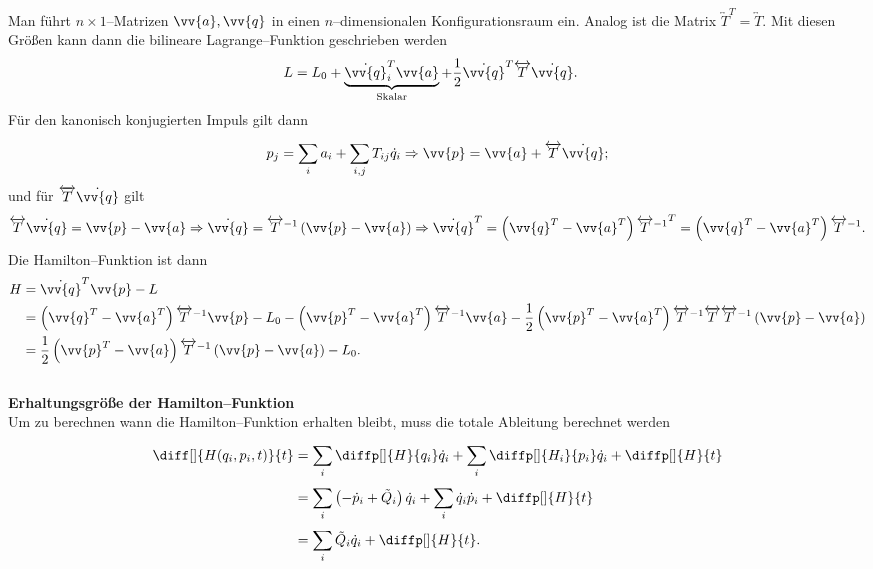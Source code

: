 \documentclass[a4paper,12pt]{article}
\numberwithin{equation}{section}
\begin{document}
Man führt $n\times 1$--Matrizen $\vv{a},\vv{q}$ in einen $n$--dimensionalen Konfigurationsraum ein. Analog ist die Matrix $\overleftrightarrow{T}^T=\overleftrightarrow{T}$. Mit diesen Größen kann dann die bilineare Lagrange--Funktion geschrieben werden
\begin{align*}
        L&=L_0+\underbrace{\dot{\vv{q}}_i^T\vv{a}}_{\text{Skalar}}+\dfrac{1}{2}\dot{\vv{q}}^T\overleftrightarrow{T}\dot{\vv{q}}
.\end{align*}
Für den kanonisch konjugierten Impuls gilt dann
\begin{align*}
        p_j=\sum_{i}^{}a_i+\sum_{i,j}^{}T_{ij}\dot{q}_i\Rightarrow \vv{p}=\vv{a}+\overleftrightarrow{T}\dot{\vv{q}}
;\end{align*}
und für $\overleftrightarrow{T}\dot{\vv{q}}$ gilt
\begin{align*}
        \overleftrightarrow{T}\dot{\vv{q}}=\vv{p}-\vv{a}\Rightarrow \dot{\vv{q}}=\overleftrightarrow{T}^{-1}\left(\vv{p}-\vv{a}\right)\Rightarrow \dot{\vv{q}}^T=\left(\vv{q}^T-\vv{a}^T\right){\overleftrightarrow{T}^{-1}}^T=\left(\vv{q}^T-\vv{a}^T\right)\overleftrightarrow{T}^{-1}
.\end{align*}
Die Hamilton--Funktion ist dann
\begin{align*}
        H&=\dot{\vv{q}}^T\vv{p}-L\\
         &=\left(\vv{q}^T-\vv{a}^T\right)\overleftrightarrow{T}^{-1}\vv{p}-L_0-\left(\vv{p}^T-\vv{a}^T\right)\overleftrightarrow{T}^{-1}\vv{a}-\dfrac{1}{2}\left(\vv{p}^T-\vv{a}^T\right)\overleftrightarrow{T}^{-1}\overleftrightarrow{T}\overleftrightarrow{T}^{-1}\left(\vv{p}-\vv{a}\right)\\
         &=\dfrac{1}{2}\left(\vv{p}^T-\vv{a}\right)\overleftrightarrow{T}^{-1}\left(\vv{p}-\vv{a}\right)-L_0
.\end{align*}
\hfill\\\textbf{Erhaltungsgröße der Hamilton--Funktion}\\ 
Um zu berechnen wann die Hamilton--Funktion erhalten bleibt, muss die totale Ableitung berechnet werden
\begin{align*}
        \diff[]{H(q_i,p_i,t)}{t}&=\sum_{i}^{}\diffp[]{H}{q_i}\dot{q}_i+\sum_{i}^{}\diffp[]{H_i}{p_i}\dot{q}_i+\diffp[]{H}{t}\\
                                &=\sum_{i}^{}\left(-\dot{p}_i+\tilde Q_i\right)\dot{q}_i+\sum_{i}^{}\dot{q}_i\dot{p}_i+\diffp[]{H}{t}\\
                                &=\sum_{i}^{}\tilde Q_i\dot{q}_i+\diffp[]{H}{t}
.\end{align*}
\end{document}
